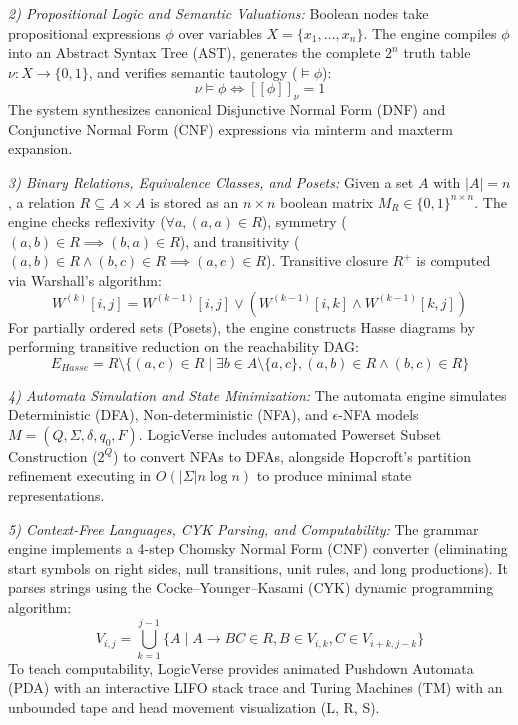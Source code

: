 \documentclass[conference]{IEEEtran}
\begin{document}
\textit{2) Propositional Logic and Semantic Valuations:} Boolean nodes take propositional expressions $\phi$ over variables $X = \{x_1, \dots, x_n\}$. The engine compiles $\phi$ into an Abstract Syntax Tree (AST), generates the complete $2^n$ truth table $\nu: X \to \{0, 1\}$, and verifies semantic tautology ($\models \phi$):
\begin{equation}
\nu \models \phi \iff [[\phi]]_{\nu} = 1
\end{equation}
The system synthesizes canonical Disjunctive Normal Form (DNF) and Conjunctive Normal Form (CNF) expressions via minterm and maxterm expansion.

\textit{3) Binary Relations, Equivalence Classes, and Posets:} Given a set $A$ with $|A| = n$, a relation $R \subseteq A \times A$ is stored as an $n \times n$ boolean matrix $M_R \in \{0, 1\}^{n \times n}$. The engine checks reflexivity ($\forall a, (a,a) \in R$), symmetry ($(a,b) \in R \implies (b,a) \in R$), and transitivity ($(a,b) \in R \land (b,c) \in R \implies (a,c) \in R$). Transitive closure $R^+$ is computed via Warshall's algorithm:
\begin{equation}
W^{(k)}[i,j] = W^{(k-1)}[i,j] \lor (W^{(k-1)}[i,k] \land W^{(k-1)}[k,j])
\end{equation}
For partially ordered sets (Posets), the engine constructs Hasse diagrams by performing transitive reduction on the reachability DAG:
\begin{equation}
E_{Hasse} = R \setminus \{(a, c) \in R \mid \exists b \in A \setminus \{a, c\}, (a,b) \in R \land (b,c) \in R\}
\end{equation}

\textit{4) Automata Simulation and State Minimization:} The automata engine simulates Deterministic (DFA), Non-deterministic (NFA), and $\epsilon$-NFA models $M = (Q, \Sigma, \delta, q_0, F)$. LogicVerse includes automated Powerset Subset Construction ($2^Q$) to convert NFAs to DFAs, alongside Hopcroft's partition refinement executing in $O(|\Sigma| n \log n)$ to produce minimal state representations.

\textit{5) Context-Free Languages, CYK Parsing, and Computability:} The grammar engine implements a 4-step Chomsky Normal Form (CNF) converter (eliminating start symbols on right sides, null transitions, unit rules, and long productions). It parses strings using the Cocke--Younger--Kasami (CYK) dynamic programming algorithm:
\begin{equation}
V_{i, j} = \bigcup_{k=1}^{j-1} \{ A \mid A \to BC \in R, B \in V_{i, k}, C \in V_{i+k, j-k} \}
\end{equation}
To teach computability, LogicVerse provides animated Pushdown Automata (PDA) with an interactive LIFO stack trace and Turing Machines (TM) with an unbounded tape and head movement visualization (L, R, S).
\end{document}
